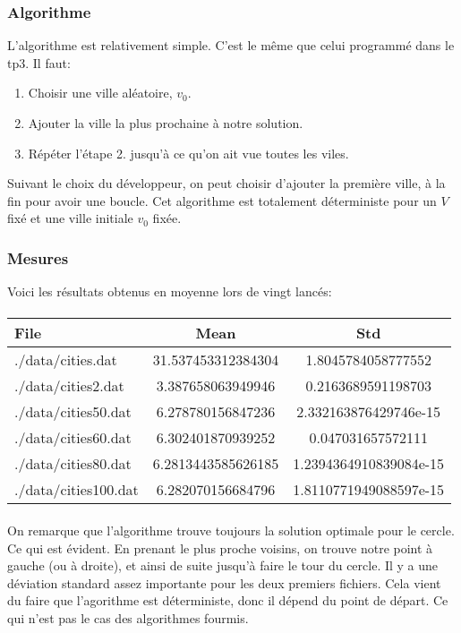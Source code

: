 \documentclass[a4paper, 11pt]{article}
\begin{document}
\subsubsection{Algorithme}
L'algorithme est relativement simple. C'est le même que celui programmé dans le tp3.
Il faut:
\begin{enumerate}
 \item Choisir une ville aléatoire, $v_0$.
 \item Ajouter la ville la plus prochaine à notre solution.
 \item Répéter l'étape 2. jusqu'à ce qu'on ait vue toutes les viles.
\end{enumerate}

Suivant le choix du développeur, on peut choisir d'ajouter la première ville, à la fin pour avoir une boucle.
Cet algorithme est totalement déterministe pour un $V$ fixé et une ville initiale $v_0$ fixée.

\subsubsection{Mesures}
Voici les résultats obtenus en moyenne lors de vingt lancés:
\paragraph{}
\begin{tabular}{|l | c |c |}
\hline
 File & Mean & Std \\
\hline
./data/cities.dat	& 31.537453312384304  & 1.8045784058777552\\
\hline
./data/cities2.dat	& 3.387658063949946  & 0.2163689591198703\\
\hline
./data/cities50.dat	& 6.278780156847236  & 2.332163876429746e-15\\
\hline
./data/cities60.dat	& 6.302401870939252  & 0.047031657572111\\
\hline
./data/cities80.dat	& 6.2813443585626185  & 1.2394364910839084e-15\\
\hline
./data/cities100.dat	& 6.282070156684796  & 1.8110771949088597e-15\\
\hline
\end{tabular}
\paragraph{}
On remarque que l'algorithme trouve toujours la solution optimale pour le cercle. Ce qui est évident. En prenant le plus proche voisins,
on trouve notre point à gauche (ou à droite), et ainsi de suite jusqu'à faire le tour du cercle.
Il y a une déviation standard assez importante pour les deux premiers fichiers. Cela vient du faire que l'agorithme est déterministe, donc
il dépend du point de départ. Ce qui n'est pas le cas des algorithmes fourmis.
\end{document}
